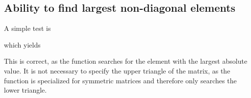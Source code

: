 \documentclass[12pt,english,a4paper]{report}
\begin{document}
\subsection{Ability to find largest non-diagonal elements}
A simple test is

which yields

This is correct, as the function searches for the element with the largest absolute value. It is not necessary to specify the upper triangle of the matrix, as the function is specialized for symmetric matrices and therefore only searches the lower triangle.








\clearpage
{}
\printbibliography
\end{document}
